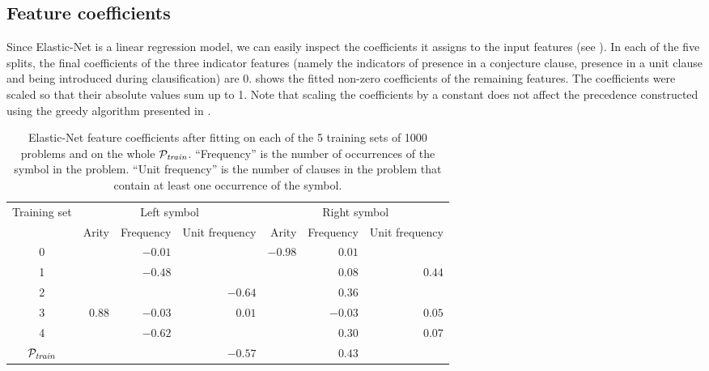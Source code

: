 \documentclass[a4paper]{easychair}
\begin{document}

\subsection{Feature coefficients}

Since Elastic-Net is a linear regression model, we can easily inspect the coefficients it assigns
to the input features (see ).
In each of the five splits, the final coefficients of the three indicator features
(namely the indicators of presence in a conjecture clause,
presence in a unit clause and
being introduced during clausification)
are 0.
 shows the fitted non-zero coefficients of the remaining features.
The coefficients were scaled so that their absolute values sum up to 1.
Note that scaling the coefficients by a constant does not affect
the precedence constructed using the greedy algorithm presented in .

\begin{table}[ht]
	\centering
	\begin{tabular}{c|rrr|rrr}
		Training set & \multicolumn{3}{c}{Left symbol} & \multicolumn{3}{c}{Right symbol} \\
		& Arity & Frequency & Unit frequency & Arity & Frequency & Unit frequency \\
		\hline
		0 &       &$-0.01$&       &$-0.98$&$ 0.01$&        \\
		1 &       &$-0.48$&       &       &$ 0.08$&$ 0.44 $\\
		2 &       &       &$-0.64$&       &$ 0.36$&        \\
		3 &$ 0.88$&$-0.03$&$ 0.01$&       &$-0.03$&$ 0.05 $\\
		4 &       &$-0.62$&       &       &$ 0.30$&$ 0.07 $\\
		\hline
		\(\mathcal{P}_{\mathit{train}}\) &       &       &$-0.57$&       &$ 0.43$&        \\
	\end{tabular}
	\caption{Elastic-Net feature coefficients after fitting on each of the 5 training sets of 1000 problems and on the whole \(\mathcal{P}_{\mathit{train}}\).
		``Frequency'' is the number of occurrences of the symbol in the problem.
		``Unit frequency'' is the number of clauses in the problem that contain at least one occurrence of the symbol.}
	\label{table:feature-weights}
\end{table}
\end{document}
